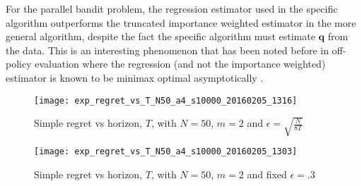 For the parallel bandit problem, the regression estimator used in the specific algorithm outperforms the truncated importance weighted estimator in the more general algorithm, despite the fact the specific algorithm must estimate $\boldsymbol{q}$ from the data. 
This is an interesting phenomenon that has been noted before in off-policy evaluation where the regression (and not the importance weighted) estimator is known to be minimax optimal asymptotically \citep{LMS14}.

\begin{figure}
\centering
\texttt{[image: exp\_regret\_vs\_T\_N50\_a4\_s10000\_20160205\_1316]}
\caption{Simple regret vs horizon, $T$, with $N = 50$, $m=2$ and $\epsilon = \sqrt{\frac{N}{8T}}$}
\label{fig:simple_vs_T_vary_epsilon}
\end{figure}

\begin{figure}
\centering
\texttt{[image: exp\_regret\_vs\_T\_N50\_a4\_s10000\_20160205\_1303]}
\caption{Simple regret vs horizon, $T$, with $N = 50$, $m=2$ and fixed $\epsilon = .3$}
\label{fig:simple_vs_T}
\end{figure}
